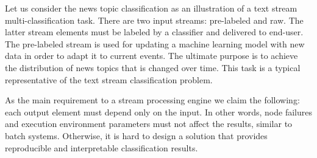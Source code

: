 \label {fs-short-problem}

Let us consider the news topic classification as an illustration of a text stream multi-classification task. There are two input streams: pre-labeled and raw. The latter stream elements must be labeled by a classifier and delivered to end-user. The pre-labeled stream is used for updating a machine learning model with new data in order to adapt it to current events. The ultimate purpose is to achieve the distribution of news topics that is changed over time. This task is a typical representative of the text stream classification problem.

As the main requirement to a stream processing engine we claim the following: each output element must depend only on the input. In other words, node failures and execution environment parameters must not affect the results, similar to batch systems. Otherwise, it is hard to design a solution that provides reproducible and interpretable classification results.